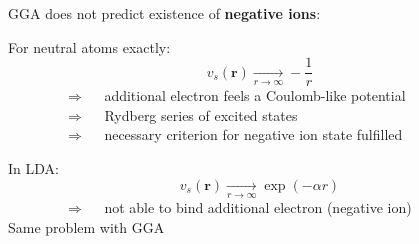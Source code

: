 \documentclass[compress]{beamer}
\begin{document}
\frame
{ 
  \frametitle{}
  \begin{small}
    {\scriptsize
      GGA does not predict existence of \alert{\textbf{negative ions}}:
      
      \vspace{3mm}
      For neutral atoms exactly:
      \begin{equation}
        v_{s}(\mathbf{r})\xrightarrow[r \rightarrow \infty ]{} -\frac{1}{r} \nonumber
      \end{equation}
      $\qquad \qquad \Longrightarrow \quad $ additional electron feels a Coulomb-like potential \\
      $\qquad \qquad \Longrightarrow \quad $ Rydberg series of excited states \\
      $\qquad \qquad \Longrightarrow \quad $ necessary criterion for negative ion state fulfilled
    
      \vspace{3mm}
      In LDA:
      \begin{equation}
        v_{s}(\mathbf{r})\xrightarrow[r \rightarrow \infty ]{} \exp(-\alpha r) \nonumber
      \end{equation}
      $\qquad \qquad \Longrightarrow \quad $ not able to bind additional electron (negative ion) \\
      Same problem with GGA
      }
  \end{small}
}
\end{document}
